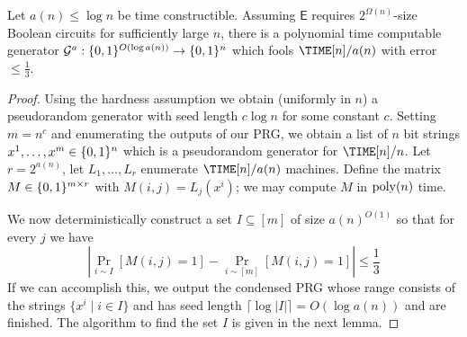 \begin{theorem}\label{randomstrings:thm:deterministic}
Let $a(n) \leq \log n$ be time constructible. Assuming $\mathsf{E}$ requires $2^{\Omega(n)}$-size Boolean circuits for sufficiently large $n$, there is a polynomial time computable generator $\mathcal{G}^a: \{0,1\}^{O(\log a(n))} \to \{0,1\}^n$ which fools $\TIME[n]/a(n)$ with error $\leq \frac{1}{3}$.
\end{theorem}
\begin{proof}
Using the hardness assumption we obtain (uniformly in $n$) a pseudorandom generator with seed length $c \log n$ for some constant $c$. Setting $m = n^c$ and enumerating the outputs of our PRG, we obtain a list of $n$ bit strings $x^1,\ldots,x^m \in \{0,1\}^n$ which is a pseudorandom generator for $\TIME[n]/n$. Let $r = 2^{a(n)}$, let $L_1,\ldots,L_{r}$ enumerate $\TIME[n]/a(n)$ machines. Define the matrix $M \in \{0,1\}^{m \times r}$ with $M(i,j) = L_j(x^i)$; we may compute $M$ in $\mathrm{poly}(n)$ time.

We now deterministically construct a set $I \subseteq [m]$ of size $a(n)^{O(1)}$ so that for every $j$ we have
\[
|\Pr_{i \sim I}[M(i,j) = 1] - \Pr_{i \sim [m]}[M(i,j) = 1]| \leq \frac{1}{3}
\]
If we can accomplish this, we output the condensed PRG whose range consists of the strings $\{x^i \mid i \in I\}$ and has seed length $\lceil \log |I| \rceil = O(\log a(n))$ and are finished. The algorithm to find the set $I$ is given in the next lemma.
\end{proof}

